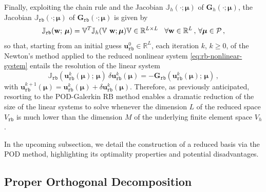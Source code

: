 \documentclass[12pt, a4paper, twoside, openright]{report}
\numberwithin{equation}{chapter}
\theoremstyle{theorem}
\theoremstyle{definition}
\theoremstyle{remark}
\theoremstyle{proposition}
\numberwithin{figure}{chapter}
\newcommand{\bg}[1]{\boldsymbol{#1}}
\begin{document}
		Finally, exploiting the chain rule and the Jacobian $\mathbb{J}_h(\cdot; \bg{\mu})$ of $\mathbf{G}_h(\cdot; \bg{\mu})$, the Jacobian $\mathbb{J}_{\texttt{rb}}(\cdot; \bg{\mu})$ of $\mathbf{G}_{\texttt{rb}}(\cdot; \bg{\mu})$ is given by
		\begin{equation}
			\label{eq:rb-nonlinear-system-jacobian}
			\mathbb{J}_{\texttt{rb}}(\mathbf{w}; \, \bg{\mu}) = \mathbb{V}^T \mathbb{J}_h(\mathbb{V} ~ \mathbf{w}; \bg{\mu}) \mathbb{V} \in \mathbb{R}^{L \times L} \hspace*{0.3cm} \forall \mathbf{w} \in \mathbb{R}^L \, , \, \forall \bg{\mu} \in \mathcal{P} \, ,
		\end{equation}
		so that, starting from an initial guess $\mathbf{u}_{\texttt{rb}}^0 \in \mathbb{R}^L$, each iteration $k$, $k \geq 0$, of the Newton's method applied to the reduced nonlinear system \eqref{eq:rb-nonlinear-system} entails the resolution of the linear system
		\begin{equation}
			\label{eq:rb-nonlinear-system-newton}
			\mathbb{J}_{\texttt{rb}}(\mathbf{u}_{\texttt{rb}}^k(\bg{\mu}); \, \bg{\mu}) ~ \delta \mathbf{u}_{\texttt{rb}}^k(\bg{\mu}) = - \mathbf{G}_{\texttt{rb}}(\mathbf{u}_{\texttt{rb}}^k(\bg{\mu}); \, \bg{\mu}) \, ,
		\end{equation}
		with $\mathbf{u}_{\texttt{rb}}^{k+1}(\bg{\mu}) = \mathbf{u}_{\texttt{rb}}^k(\bg{\mu}) + \delta \mathbf{u}_{\texttt{rb}}^k(\bg{\mu})$. Therefore, as previously anticipated, resorting to the POD-Galerkin RB method enables a dramatic reduction of the size of the linear systems to solve whenever the dimension $L$ of the reduced space $V_{\texttt{rb}}$ is much lower than the dimension $M$ of the underlying finite element space $V_h$. 
		
		In the upcoming subsection, we detail the construction of a reduced basis via the POD method, highlighting its optimality properties and potential disadvantages.
		
	\vspace*{0.3cm}
		
	\subsection{Proper Orthogonal Decomposition}
	\label{section:Proper Orthogonal Decomposition} 
		
\end{document}
